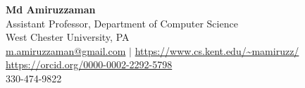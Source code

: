 \documentclass{article}
\begin{document}
\begin{center}
\thispagestyle{empty}
\large \textbf{Md Amiruzzaman \\}
\normalsize Assistant Professor, Department of Computer Science\\
\normalsize  West Chester University, PA\\
\normalsize \href{mailto:m.amiruzzaman@gmail.com}{m.amiruzzaman@gmail.com} $\mid$  \url{https://www.cs.kent.edu/~mamiruzz/}\\%
\normalsize \url{https://orcid.org/0000-0002-2292-5798}\\
\normalsize 330-474-9822\\ 
\hrulefill
\end{center}


\end{document}
